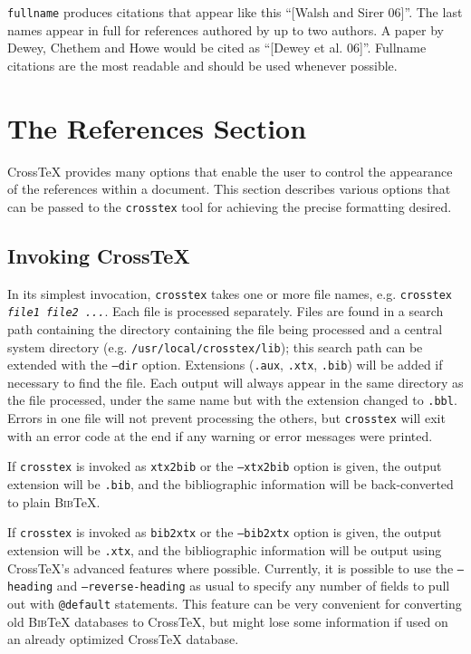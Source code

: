 \documentclass{article}
\newcommand{\XTX}{Cross\TeX}
\newcommand{\BibTeX}{\textsc{Bib}\TeX}
\begin{document}
\texttt{fullname} produces citations that appear like this ``[Walsh and
Sirer 06]''. The last names appear in full for references authored by
up to two authors. A paper by Dewey, Chethem and Howe would be cited as
``[Dewey et al. 06]''.  Fullname citations are the most readable and
should be used whenever possible.

\section{The References Section\label{sec:references}}

\XTX{} provides many options that enable the user to control the
appearance of the references within a document. This section describes
various options that can be passed to the \texttt{crosstex} tool for
achieving the precise formatting desired.

\subsection{Invoking \XTX{}}

In its simplest invocation, \texttt{crosstex} takes one or more file
names, e.g. \texttt{crosstex \textrm{\textit{file1 file2 ...}}}. Each
file is processed separately. Files are found in a search path containing
the directory containing the file being processed and a central system
directory (e.g. \texttt{/usr/local/crosstex/lib}); this search path can
be extended with the \texttt{--dir} option. Extensions (\texttt{.aux},
\texttt{.xtx}, \texttt{.bib}) will be added if necessary to find the
file. Each output will always appear in the same directory as the
file processed, under the same name but with the extension changed to
\texttt{.bbl}. Errors in one file will not prevent processing the others,
but \texttt{crosstex} will exit with an error code at the end if any
warning or error messages were printed.

If \texttt{crosstex} is invoked as \texttt{xtx2bib} or the
\texttt{--xtx2bib} option is given, the output extension will be
\texttt{.bib}, and the bibliographic information will be back-converted
to plain \BibTeX{}.

If \texttt{crosstex} is invoked as \texttt{bib2xtx} or the
\texttt{--bib2xtx} option is given, the output extension will be
\texttt{.xtx}, and the bibliographic information will be output using
\XTX{}'s advanced features where possible.  Currently, it is possible
to use the \texttt{--heading} and \texttt{--reverse-heading} as usual
to specify any number of fields to pull out with \texttt{@default}
statements.  This feature can be very convenient for converting old
\BibTeX{} databases to \XTX{}, but might lose some information if used
on an already optimized \XTX{} database.
\end{document}
